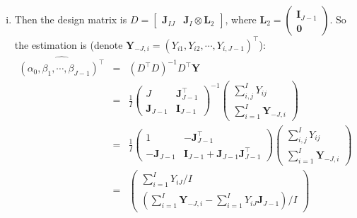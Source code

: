 \documentclass[12pt]{article}
\newcommand{\ttt}[1]{\textbf{#1}}
\begin{document}
\begin{enumerate}
\begin{enumerate}[A.]
\begin{enumerate}[i.]
            \item
            Then the design matrix is $D = \begin{bmatrix} \ttt{J}_{IJ} & \ttt{J}_I \otimes \ttt{L}_2 \end{bmatrix}$, where $\ttt{L}_2 = \begin{pmatrix} \ttt{I}_{J-1} \\ \ttt{0}\end{pmatrix}$.
            So the estimation is (denote $\ttt{Y}_{-J,i} = (Y_{i1},Y_{i2},\cdots,Y_{i,J-1})^\top$):
            \begin{eqnarray}
                \widehat{(\alpha_0,\beta_1,\cdots,\beta_{J-1})^\top} &=& (D^\top D)^{-1} D^\top \ttt{Y} \\
                                                                 &=& \frac{1}{I} \begin{pmatrix}
                                                                                    J & \ttt{J}_{J-1}^\top \\
                                                                                    \ttt{J}_{J-1} & \ttt{I}_{J-1}
                                                                                 \end{pmatrix}^{-1} \begin{pmatrix} \sum_{i,j}^I Y_{ij} \\ \sum_{i=1}^{I} \ttt{Y}_{-J,i}\end{pmatrix} \\
                                                                 &=& \frac{1}{I} \begin{pmatrix}
                                                                    1 & -\ttt{J}_{J-1}^\top \\
                                                                    -\ttt{J}_{J-1} & \ttt{I}_{J-1} + \ttt{J}_{J-1}\ttt{J}_{J-1}^\top
                                                                 \end{pmatrix} \begin{pmatrix} \sum_{i,j}^I Y_{ij} \\ \sum_{i=1}^{I} \ttt{Y}_{-J,i}\end{pmatrix} \\
                                                                 &=& \begin{pmatrix} \sum_{i=1}^{I} Y_{iJ} / I \\ (\sum_{i=1}^{I} \ttt{Y}_{-J,i} - \sum_{i=1}^{I} Y_{iJ} \ttt{J}_{J-1}) / I\end{pmatrix}
            \end{eqnarray}


\end{enumerate}
\end{enumerate}
\end{enumerate}
\end{document}
